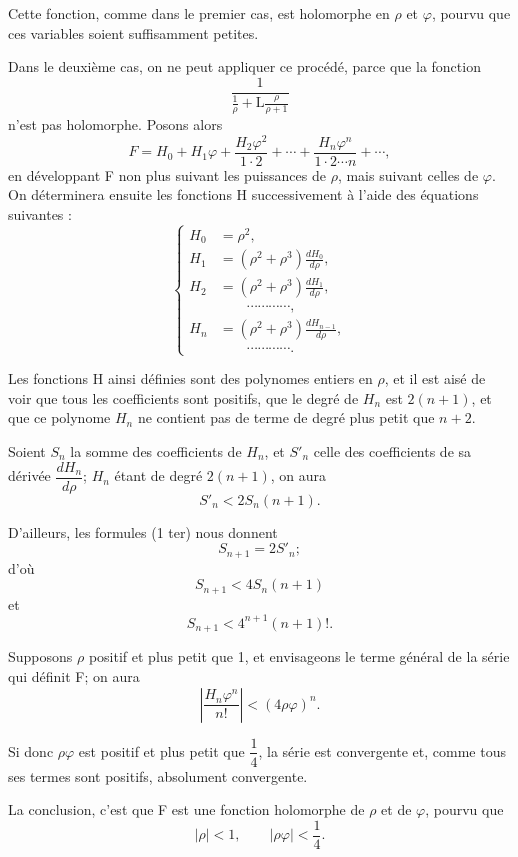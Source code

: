 \documentclass[11pt]{article}
\begin{document}
Cette fonction, comme dans le premier cas, est holomorphe en $\rho$ et $\varphi$, pourvu que ces variables soient suffisamment petites.

Dans le deuxième cas, on ne peut appliquer ce procédé, parce que la fonction
\[
\frac{1}{\frac1\rho+\mathrm L\frac{\rho}{\rho+1}}
\]
n’est pas holomorphe. Posons alors
\[
F=H_0+H_1\varphi+\frac{H_2\varphi^2}{1\cdot2}+\cdots+\frac{H_n\varphi^n}{1\cdot2\cdots n}+\cdots,
\]
en développant F non plus suivant les puissances de $\rho$, mais suivant celles de $\varphi$. On déterminera ensuite les fonctions H successivement à l’aide des équations suivantes :
\begin{equation}\tag{1 ter}
\left\{
\begin{aligned}
H_0&=\rho^2,\\
H_1&=(\rho^2+\rho^3)\frac{dH_0}{d\rho},\\
H_2&=(\rho^2+\rho^3)\frac{dH_1}{d\rho},\\
&\hspace{2em}\cdots\cdots\cdots\cdots,\\
H_n&=(\rho^2+\rho^3)\frac{dH_{n-1}}{d\rho},\\
&\hspace{2em}\cdots\cdots\cdots\cdots.
\end{aligned}
\right.
\end{equation}

Les fonctions H ainsi définies sont des polynomes entiers en $\rho$, et il est aisé de voir que tous les coefficients sont positifs, que le degré de $H_n$ est $2(n+1)$, et que ce polynome $H_n$ ne contient pas de terme de degré plus petit que $n+2$.

Soient $S_n$ la somme des coefficients de $H_n$, et $S'_n$ celle des coefficients de sa dérivée $\dfrac{dH_n}{d\rho}$; $H_n$ étant de degré $2(n+1)$, on aura
\[
S'_n<2S_n(n+1).
\]

D’ailleurs, les formules (1 ter) nous donnent
\[
S_{n+1}=2S'_n;
\]
d’où
\[
S_{n+1}<4S_n(n+1)
\]
et
\[
S_{n+1}<4^{n+1}(n+1)!.
\]

Supposons $\rho$ positif et plus petit que 1, et envisageons le terme général de la série qui définit F; on aura
\[
\left|\frac{H_n\varphi^n}{n!}\right|<(4\rho\varphi)^n.
\]

Si donc $\rho\varphi$ est positif et plus petit que $\dfrac14$, la série est convergente et, comme tous ses termes sont positifs, absolument convergente.

La conclusion, c’est que F est une fonction holomorphe de $\rho$ et de $\varphi$, pourvu que
\[
|\rho|<1,
\qquad
|\rho\varphi|<\frac14.
\]
\end{document}
